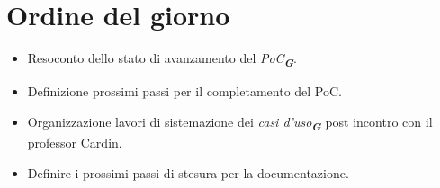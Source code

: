 

\section{Ordine del giorno}

\begin{itemize}
    \item Resoconto dello stato di avanzamento del \emph{PoC}\textsubscript{\textit{\textbf{G}}}.
    \item Definizione prossimi passi per il completamento del PoC.
    \item Organizzazione lavori di sistemazione dei \emph{casi d'uso}\textsubscript{\textit{\textbf{G}}} post incontro con il professor Cardin.
    \item Definire i prossimi passi di stesura per la documentazione.
\end{itemize}

